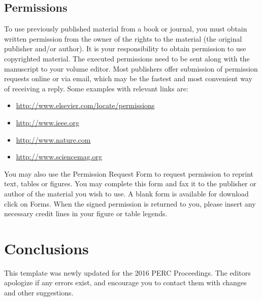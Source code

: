 \documentclass[english,aps,pra,reprint,noshowpacs,superscriptaddress]{revtex4-1}
\begin{document}
\subsection{Permissions}
To use previously published material from a book or journal, you must
obtain written permission from the owner of the rights to the material
(the original publisher and/or author). It is your responsibility to
obtain permission to use copyrighted material. The executed
permissions need to be sent along with the manuscript to your volume
editor. Most publishers offer submission of permission requests online
or via email, which may be the fastest and most convenient way of
receiving a reply. Some examples with relevant links are:

\begin{itemize}
\item \url{http://www.elsevier.com/locate/permissions}
\item \url{http://www.ieee.org}
\item \url{http://www.nature.com}
\item \url{http://www.sciencemag.org}
\end{itemize}

You may also use the Permission Request Form to request permission to
reprint text, tables or figures. You may complete this form and fax it
to the publisher or author of the material you wish to use. A blank
form is available for download click on Forms. When the signed
permission is returned to you, please insert any necessary credit
lines in your figure or table legends.


\section{Conclusions}
This template was newly updated for the 2016 PERC Proceedings.  The
editors apologize if any errors exist, and encourage you to contact
them with changes and other suggestions.  


\end{document}
